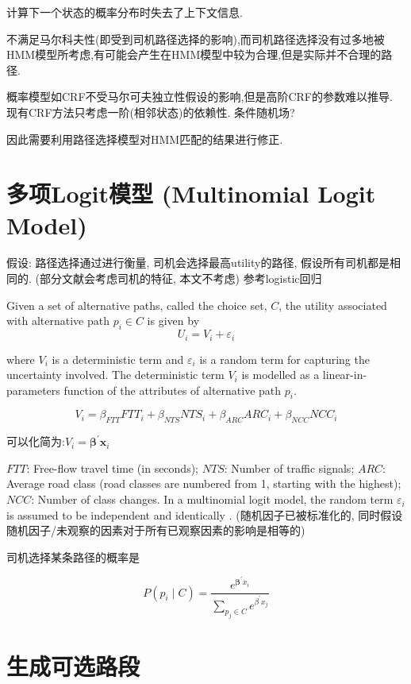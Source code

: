 \label{Problem:PureHMM1}

计算下一个状态的概率分布时失去了上下文信息.

不满足马尔科夫性(即受到司机路径选择的影响),而司机路径选择没有过多地被HMM模型所考虑,有可能会产生在HMM模型中较为合理,但是实际并不合理的路径.

概率模型如CRF不受马尔可夫独立性假设的影响,但是高阶CRF的参数难以推导. 现有CRF方法只考虑一阶(相邻状态)的依赖性. 条件随机场?

因此需要利用路径选择模型对HMM匹配的结果进行修正.

\section{多项Logit模型 (Multinomial Logit Model)}

假设: 路径选择通过进行衡量, 司机会选择最高utility的路径, 假设所有司机都是相同的. (部分文献会考虑司机的特征, 本文不考虑) 参考logistic回归

Given a set of alternative paths, called the choice set, $ C $, the utility associated with alternative path $ p_{i} \in C $ is given by
$$
U_{i}=V_{i}+\varepsilon_{i}
$$

where $ V_{i} $ is a deterministic term and $ \varepsilon_{i} $ is a random term for capturing the uncertainty involved. The deterministic term $ V_{i} $ is modelled as a linear-in-parameters function of the attributes of alternative path $ p_{i} $. 

$$ V_{i}=\beta_{F T T} F T T_{i}+\beta_{N T S} N T S_{i}+\beta_{A R C} A R C_{i}+\beta_{N C C} N C C_{i} $$

可以化简为:$ V_{i}=\boldsymbol{\beta}^{\prime} \boldsymbol{x}_{i} $

$FTT$: Free-flow travel time (in seconds); $N T S$: Number of traffic signals; $ARC$: Average road class (road classes are numbered from 1, starting with the highest); $NCC$: Number of class changes. In a multinomial logit model, the random term $ \varepsilon_{i} $ is assumed to be independent and identically . (随机因子已被标准化的, 同时假设随机因子/未观察的因素对于所有已观察因素的影响是相等的)

司机选择某条路径的概率是

$$ P\left(p_{i} \mid C\right)=\frac{e^{\boldsymbol{\beta}^{\prime} x_{i}}}{\sum_{p_{j} \in C} e^{\beta^{\prime} x_{j}}} $$

\section{生成可选路段}

